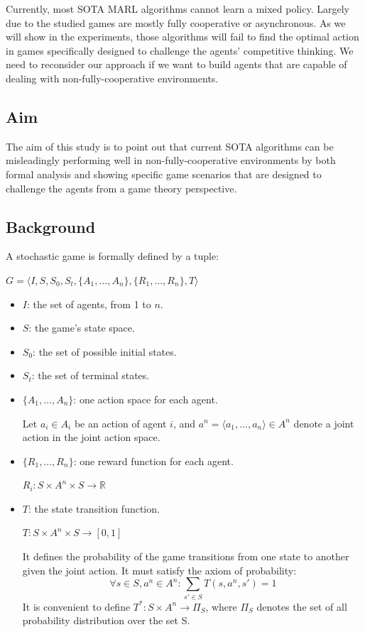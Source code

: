 \documentclass[a4paper]{article}
\begin{document}
\begin{multicols}{2}
Currently, most SOTA MARL algorithms cannot learn a mixed policy. Largely due to the studied games are mostly fully cooperative or asynchronous. As we will show in the experiments, those algorithms will fail to find the optimal action in games specifically designed to challenge the agents' competitive thinking. We need to reconsider our approach if we want to build agents that are capable of dealing with non-fully-cooperative environments.

\subsection{Aim}
The aim of this study is to point out that current SOTA algorithms can be misleadingly performing well in non-fully-cooperative environments by both formal analysis and showing specific game scenarios that are designed to challenge the agents from a game theory perspective.

\subsection{Background}

A stochastic game is formally defined by a tuple:

$G = \langle I,S,S_0,S_t,\{A_1,\ldots,A_n\},\{R_1,\ldots,R_n\},T \rangle$
\begin{itemize}
    \item $I$: the set of agents, from 1 to \(n\).
    \item $S$: the game’s state space.
    \item $S_0$: the set of possible initial states.
    \item $S_t$: the set of terminal states.
    \item $\{A_1,\ldots,A_n\}$: one action space for each agent.

    Let $a_i \in A_i$ be an action of agent $i$, and $a^n=\langle a_1,\ldots,a_n \rangle \in A^n$ denote a joint action in the joint action space.
    \item $\{R_1,\ldots,R_n\}$: one reward function for each agent.

    $R_i:S \times A^n \times S \rightarrow \mathbb{R}$
    \item $T$: the state transition function.

    $T:S \times A^n \times S \rightarrow [0,1]$

    It defines the probability of the game transitions from one state to another given the joint action. It must satisfy the axiom of probability:
    \begin{equation}
    \forall s \in S,a^n \in A^n: \sum_{s' \in S}{T(s,a^n,s')}=1
    \label{eq:statetransition}
    \end{equation}
    It is convenient to define $T^*:S \times A^n \rightarrow \Pi_S$, where $\Pi_S$ denotes the set of all probability distribution over the set S.


\end{itemize}
\end{multicols}
\end{document}
